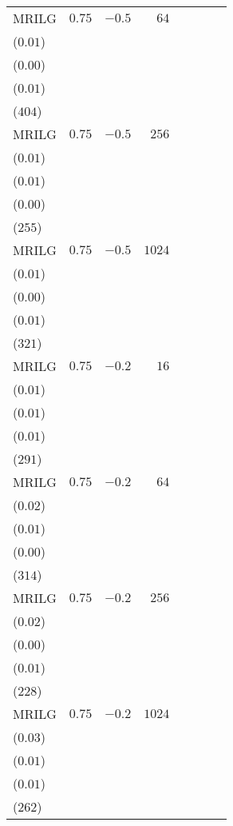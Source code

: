\begin{table}[t]
\begin{tabular}{lrrrrrrr}
MRILG & \(0.75\) & \(-0.5\) & \(64\) & \longcell{\(0.05\)\\{\tiny(\(0.01\))}} & \longcell{\(0.00\)\\{\tiny(\(0.00\))}} & \longcell{\(0.84\)\\{\tiny(\(0.01\))}} & \longcell{\(6105\)\\{\tiny(\(404\))}} \\[2.2ex]
MRILG & \(0.75\) & \(-0.5\) & \(256\) & \longcell{\(0.07\)\\{\tiny(\(0.01\))}} & \longcell{\(0.00\)\\{\tiny(\(0.01\))}} & \longcell{\(0.84\)\\{\tiny(\(0.00\))}} & \longcell{\(6077\)\\{\tiny(\(255\))}} \\[2.2ex]
MRILG & \(0.75\) & \(-0.5\) & \(1024\) & \longcell{\(0.09\)\\{\tiny(\(0.01\))}} & \longcell{\(0.00\)\\{\tiny(\(0.00\))}} & \longcell{\(0.84\)\\{\tiny(\(0.01\))}} & \longcell{\(6122\)\\{\tiny(\(321\))}} \\[2.2ex]
MRILG & \(0.75\) & \(-0.2\) & \(16\) & \longcell{\(0.02\)\\{\tiny(\(0.01\))}} & \longcell{\(0.00\)\\{\tiny(\(0.01\))}} & \longcell{\(0.83\)\\{\tiny(\(0.01\))}} & \longcell{\(6385\)\\{\tiny(\(291\))}} \\[2.2ex]
MRILG & \(0.75\) & \(-0.2\) & \(64\) & \longcell{\(0.04\)\\{\tiny(\(0.02\))}} & \longcell{\(0.00\)\\{\tiny(\(0.01\))}} & \longcell{\(0.84\)\\{\tiny(\(0.00\))}} & \longcell{\(5914\)\\{\tiny(\(314\))}} \\[2.2ex]
MRILG & \(0.75\) & \(-0.2\) & \(256\) & \longcell{\(0.07\)\\{\tiny(\(0.02\))}} & \longcell{\(0.00\)\\{\tiny(\(0.00\))}} & \longcell{\(0.84\)\\{\tiny(\(0.01\))}} & \longcell{\(6077\)\\{\tiny(\(228\))}} \\[2.2ex]
MRILG & \(0.75\) & \(-0.2\) & \(1024\) & \longcell{\(0.09\)\\{\tiny(\(0.03\))}} & \longcell{\(0.00\)\\{\tiny(\(0.01\))}} & \longcell{\(0.83\)\\{\tiny(\(0.01\))}} & \longcell{\(6000\)\\{\tiny(\(262\))}} \\[2.2ex]

\end{tabular}
\end{table}
